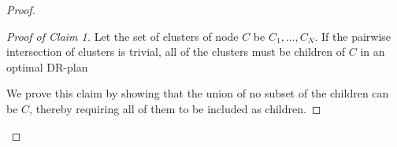 \begin{proof}





    \begin{proof}[Proof of Claim 1]
        Let the set of clusters of node $C$ be $C_1,\ldots,C_N$. If the pairwise intersection of clusters is trivial, all of the clusters must be children of $C$ in an optimal DR-plan

        We prove this claim by showing that the union of no subset of the children can be $C$, thereby requiring all of them to be included as children.


\end{proof}
\end{proof}

